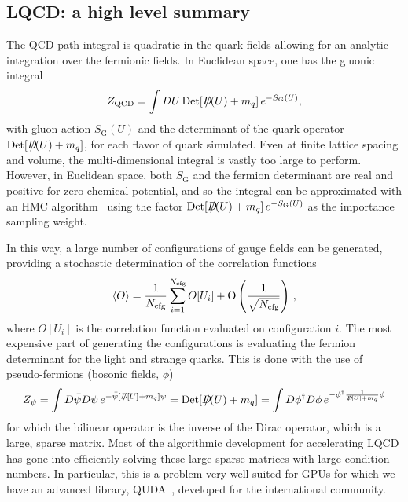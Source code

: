 \documentclass{ar-1col}
\def\Dslash{D\hskip-0.65em /}
\def\Dslashe{D\hskip-0.5em /}
\begin{document}
\subsection{LQCD: a high level summary}
The QCD path integral is quadratic in the quark fields allowing for an analytic integration over the fermionic fields. In Euclidean space, one has the gluonic integral
\begin{equation}\label{eq:Z_QCD}
Z_{\mathrm{QCD}} = \int D U\, {\rm Det}[\Dslash(U) + m_q]\, e^{-S_{\mathrm{G}}(U)},
\end{equation}
with gluon action $S_{\mathrm{G}}(U)$ and the determinant of the quark operator ${\rm Det}[\Dslash(U) + m_q]$, for each flavor of quark simulated.
Even at finite lattice spacing and volume, the multi-dimensional integral is vastly too large to perform.
However, in Euclidean space, both $S_{\mathrm{G}}$ and the fermion determinant are real and positive for zero chemical potential, and so the integral can be approximated with an HMC algorithm~\cite{Duane:1987de} using the factor ${\rm Det}[\Dslash(U) + m_q]\, e^{-S_{\mathrm{G}}(U)}$ as the importance sampling weight.%
\begin{marginnote}
\end{marginnote}%
In this way, a large number of configurations of gauge fields can be generated, providing a stochastic determination of the correlation functions
\begin{equation}
\langle O \rangle = \frac{1}{N_{\rm cfg}}\sum_{i=1}^{N_{\rm cfg}} O[U_i]
    +\mathrm{O}\left(\frac{1}{\sqrt{N_{\rm cfg}}} \right)\, ,
\end{equation}
where $O[U_i]$ is the correlation function evaluated on configuration $i$.
The most expensive part of generating the configurations is evaluating the fermion determinant for the light and strange quarks.
This is done with the use of pseudo-fermions (bosonic fields, $\phi$)
\begin{equation}
Z_\psi = \int D\bar{\psi}D\psi\, e^{-\bar{\psi}[\Dslashe[U]+m_q]\psi}
    = {\rm Det}[\Dslash(U) + m_q]
    = \int D\phi^\dagger D\phi\, e^{-\phi^\dagger \frac{1}{\Dslashe[U]+m_q} \phi}
\end{equation}
for which the bilinear operator is the inverse of the Dirac operator, which is a large, sparse matrix.
Most of the algorithmic development for accelerating LQCD has gone into efficiently solving these large sparse matrices with large condition numbers.  In particular, this is a problem very well suited for GPUs
for which we have an advanced library, QUDA~\cite{Clark:2009wm,Babich:2011np}, developed for the international community.%
\begin{marginnote}
\end{marginnote}%
\end{document}
